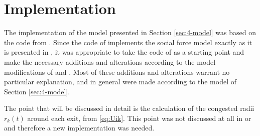 \section{Implementation}
The implementation of the model presented in Section \ref{sec:4-model} was based on the code from \cite{Hardmeier2012}. Since the code of \cite{Hardmeier2012} implements the social force model exactly as it is presented in \cite{Helbing2000}, it was appropriate to take the code of \cite{Hardmeier2012} as a starting point and make the necessary additions and alterations according to the model modifications of \cite{Zainuddin2010} and \cite{Wang2016}. Most of these additions and alterations warrant no particular explanation, and in general were made according to the model of Section \ref{sec:4-model}.

The point that will be discussed in detail is the calculation of the congested radii $r_k(t)$ around each exit, from \eqref{eq:Uik}. This point was not discussed at all in \cite{Zainuddin2010} or \cite{Wang2016} and therefore a new implementation was needed.
